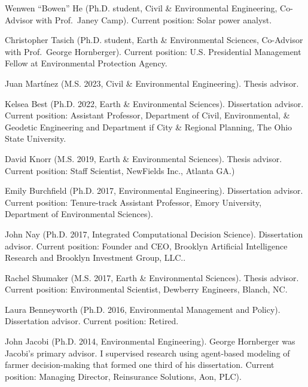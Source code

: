 \item Wenwen ``Bowen'' He (Ph.D. student, Civil \& Environmental Engineering, 
  Co-Advisor with Prof.\ Janey Camp).
  Current position: Solar power analyst.
\item Christopher Tasich (Ph.D. student, Earth \& Environmental Sciences, Co-Advisor with 
  Prof.\ George Hornberger).
  Current position: U.S. Presidential Management Fellow at Environmental Protection Agency.
\item Juan Mart\'inez (M.S. 2023, Civil \& Environmental Engineering).
  Thesis advisor.
\item Kelsea Best (Ph.D. 2022, Earth \& Environmental Sciences).
  Dissertation advisor.
  Current position: Assistant Professor, Department of Civil, Environmental, \& Geodetic
  Engineering and Department if City \& Regional Planning,
  The Ohio State University.
\item David Knorr (M.S. 2019, Earth \& Environmental Sciences).
  Thesis advisor.
  Current position: Staff Scientist, NewFields Inc., Atlanta GA.)
\item Emily Burchfield (Ph.D. 2017, Environmental Engineering).
  Dissertation advisor.
  Current position: Tenure-track Assistant Professor, Emory University, Department of Environmental Sciences).
\item John Nay (Ph.D. 2017, Integrated Computational Decision Science).
  Dissertation advisor.
  Current position: Founder and CEO, Brooklyn Artificial Intelligence Research and Brooklyn Investment Group, LLC..
\item Rachel Shumaker (M.S. 2017, Earth \& Environmental Sciences).
  Thesis advisor.
  Current position: Environmental Scientist, Dewberry Engineers, Blanch, NC.
\item Laura Benneyworth (Ph.D. 2016, Environmental Management and Policy).
  Dissertation advisor.
  Current position: Retired.
\item John Jacobi (Ph.D. 2014, Environmental Engineering).
  George Hornberger was Jacobi's primary advisor.
  I supervised research using agent-based modeling of farmer decision-making that formed one third of his dissertation.
  Current position: Managing Director, Reinsurance Solutions, Aon, PLC).
